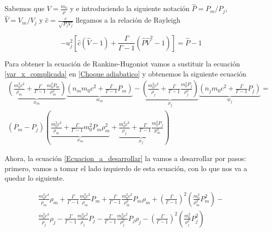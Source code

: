 \documentclass[12pt,a4paper]{book}
\begin{document}
Sabemos que $V = \frac{m_0}{\rho}$ y e introduciendo la siguiente notación $\hat{P}=P_m/P_j$, $\hat{V}=V_m/V_j$ y $\hat{c} = \frac{c}{\sqrt{P_j V_j}}$ llegamos a la relación de Rayleigh

\begin{equation}
-u_j^2
\left[ \hat{c}  \left( \hat{V} - 1 \right)+
\frac{\Gamma}{\Gamma-1} \left( \hat{P} \hat{V}^2 - 1 \right) \right] = 
\hat{P} - 1
\end{equation}

Para obtener la ecuación de Rankine-Hugoniot vamos a sustituir la ecuación \ref{var_x_complicada} en \ref{Choque adiabatico} y obtenemos la siguiente ecuación
\begin{eqnarray}\label{Ecuacion_a_desarrollar}
\underbrace { \left( \frac { m _ { 0 } ^ { 2 } c ^ { 2 } } { \rho _ { m } } + \frac { \Gamma } { \Gamma - 1 } \frac { m _ { 0 } ^ { 2 } P _ { m } } { \rho _ { m } ^ { 2 } } \right) } _ { x _ { m } } \underbrace { \left( n _ { m } m _ { 0 } c ^ { 2 } + \frac { \Gamma } { \Gamma - 1 } P _ { m } \right) } _ { w _ { m } }
- \underbrace { \left( \frac { m _ { 0 } ^ { 2 } c ^ { 2 } } { \rho _ { j } } + \frac { \Gamma } { \Gamma - 1 } \frac { m _ { 0 } ^ { 2 } P _ { j } } { \rho _ { j } ^ { 2 } } \right) } _ { x _ { j } } \underbrace { \left( n _ { j } m _ { 0 } c ^ { 2 } + \frac { \Gamma } { \Gamma - 1 } P _ { j } \right) } _ { w _ { j } } = \nonumber \\ 
\left( P _ { m } - P _ { j } \right) \left( \underbrace { \frac { m _ { 0 } ^ { 2 } c ^ { 2 } } { \rho _ { m } } + \frac { \Gamma } { \Gamma - 1 }  { m _ { 0 } ^ { 2 } P _ { m } } { \rho _ { m } ^ { 2 } } } _ { x _ { m } } + \underbrace { \frac { m _ { 0 } ^ { 2 } c ^ { 2 } } { \rho _ { j } } + \frac { \Gamma } { \Gamma - 1 } \frac { m _ { 0 } ^ { 2 } P _ { j } } { p _ { m } ^ { 2 } } } _ { x _ { j } } \right)
\end{eqnarray}

Ahora, la ecuación \ref{Ecuacion_a_desarrollar} la vamos a desarrollar por pasos: primero, vamos a tomar el lado izquierdo de esta ecuación, con lo que nos va a quedar lo siguiente.

\begin{eqnarray}\label{side_left}
\frac { m _ { 0 } ^ { 2 } c ^ { 4 } } { \rho _ { m } } \rho _ { m } + \frac { \Gamma } { \Gamma - 1 } \frac { m _ { 0 } ^ { 2 } c ^ { 2 } } { \rho _ { m } } P _ { m } +
\frac { \Gamma } { \Gamma - 1 } \frac { m _ { 0 } ^ { 2 } c ^ { 2 } } { \rho _ { m } ^ { 2 } } P _ { m } \rho _ { m } + \left( \frac { \Gamma } { \Gamma - 1 } \right) ^ { 2 } \left( \frac { m _ { 0 } ^ { 2 } } { \rho _ { m } ^ { 2 } } P _ { m } ^ { 2 } \right)- \nonumber \\
 \frac { m _ { 0 } ^ { 2 } c ^ { 4 } } { \rho _ { j } } \rho _ { j } - \frac { \Gamma } { \Gamma - 1 } \frac { m _ { 0 } ^ { 2 } c ^ { 2 } } { \rho _ { j } } P _ { j }
 - \frac { \Gamma } { \Gamma - 1 } \frac { m _ { 0 } ^ { 2 } c ^ { 2 } } { \rho _ { j } ^ { 2 } } P _ { j } \rho _ { j } - \left( \frac { \Gamma } { \Gamma - 1 } \right) ^ { 2 } \left( \frac { m _ { 0 } ^ { 2 } } { \rho _ { j } ^ { 2 } } P _ { j } ^ { 2 } \right)
\end{eqnarray}
\end{document}
